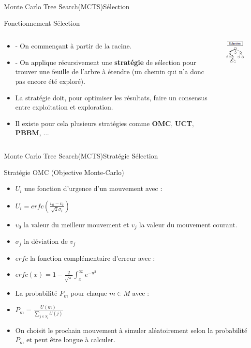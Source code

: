 \begin{frame}{Monte Carlo Tree Search(MCTS)}{Sélection}
	\begin{block}{Fonctionnement Sélection}
		\begin{columns}
			\begin{column}{7cm}
				\begin{itemize}
					\item - On commençant à partir de la racine. \item - On applique récursivement une \textbf{stratégie} de sélection pour trouver une feuille de l'arbre à étendre (un chemin qui n'a donc pas encore été exploré).
					\item La stratégie doit, pour optimiser les résultats, faire un consensus entre exploitation et exploration.
					\item Il existe pour cela plusieurs stratégies comme \textbf{OMC}, \textbf{UCT}, \textbf{PBBM}, ...
				\end{itemize}
			\end{column}
			\begin{column}{4cm}
				\includegraphics[width=3cm]{ressources/MCTS/Selection.png}
			\end{column}
		\end{columns}
	\end{block}
\end{frame}

\begin{frame}{Monte Carlo Tree Search(MCTS)}{Stratégie Sélection}
	\begin{block}{Stratégie OMC (Objective Monte-Carlo)}
		\begin{itemize}
			\item $U_{i}$ une fonction d'urgence d'un mouvement avec :
			\item $U_{i} = erfc(\frac{v_{0} - v_{i}}{\sqrt{2}\sigma_{i}})$
			\item $v_{0}$ la valeur du meilleur mouvement et $v_{j}$ la valeur du mouvement courant.
			\item $\sigma_{j}$ la déviation de $v_{j}$
			\item $erfc$ la fonction complémentaire d'erreur avec :
			\item $erfc(x) = 1 - \frac{2}{\sqrt{\pi}}\int_{x}^{\infty}e^{-u^{2}}$
			\item La probabilité $P_{m}$ pour chaque $m \in M$ avec :
			\item $P_{m} = \frac{U(m)}{\sum_{j \in S_{i}}^{}U(j)}$
			\item On choisit le prochain mouvement à simuler aléatoirement selon la probabilité $P_{m}$ et peut être longue à calculer.
		\end{itemize}
	\end{block}
\end{frame}

